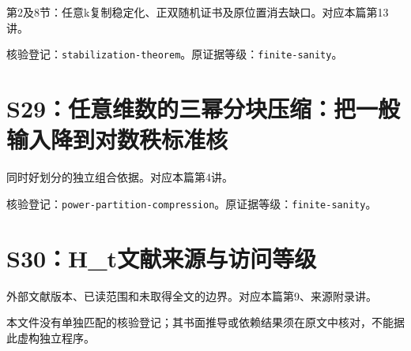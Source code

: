 \documentclass[11pt,a4paper,oneside,openany]{book}
\theoremstyle{definition}\newtheorem{example}[theorem]{例}\newtheorem{conjecture}[theorem]{猜想}
\numberwithin{equation}{chapter}\setcounter{tocdepth}{1}
\begin{document}
第2及8节：任意k复制稳定化、正双随机证书及原位置消去缺口。对应本篇第13讲。

\par{}\par

核验登记：{\small\nolinkurl{stabilization-theorem}}。原证据等级：{\small\nolinkurl{finite-sanity}}。

\section{S29：任意维数的三幂分块压缩：把一般输入降到对数秩标准核}\label{source:S29}

同时好划分的独立组合依据。对应本篇第4讲。

\par{}\par

核验登记：{\small\nolinkurl{power-partition-compression}}。原证据等级：{\small\nolinkurl{finite-sanity}}。

\section{S30：H\_t文献来源与访问等级}\label{source:S30}

外部文献版本、已读范围和未取得全文的边界。对应本篇第9、来源附录讲。

\par{}\par

本文件没有单独匹配的核验登记；其书面推导或依赖结果须在原文中核对，不能据此虚构独立程序。
\end{document}
